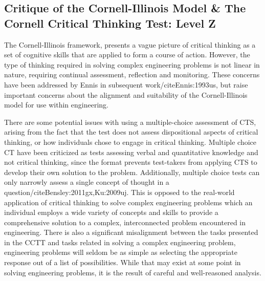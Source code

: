 \subsection{Critique of the Cornell-Illinois Model & The Cornell Critical Thinking Test: Level Z}

The Cornell-Illinois framework, presents a vague picture of critical thinking as a set of cognitive skills that are applied to form a course of action.  However, the type of thinking required in solving complex engineering problems is not linear in nature, requiring continual assessment, reflection and monitoring.  These concerns have been addressed by Ennis in subsequent work/cite{Ennis:1993us}, but raise important concerns about the alignment and suitability of the Cornell-Illinois model for use within engineering.  

There are some potential issues with using a multiple-choice assessment of CTS, arising from the fact that the test does not assess dispositional aspects of critical thinking, or how individuals chose to engage in critical thinking.  Multiple choice CT have been criticized as tests assessing verbal and quantitative knowledge and not critical thinking, since the format prevents test-takers from applying CTS to develop their own solution to the problem\cite{Abrami:2008td, Ku:2009uj}. Additionally, multiple choice tests can only narrowly assess a single concept of thought in a question/cite{Bensley:2011gx,Ku:2009uj}. This is opposed to the real-world application of critical thinking to solve complex engineering problems which an individual employs a wide variety of concepts and skills to provide a comprehensive solution to a complex, interconnected problem encountered in engineering.  There is also a significant misalignment between the tasks presented in the CCTT and tasks related in solving a complex engineering problem, engineering problems will seldom be as simple as selecting the appropriate response out of a list of possibilities.  While that may exist at some point in solving engineering problems, it is the result of careful and well-reasoned analysis.